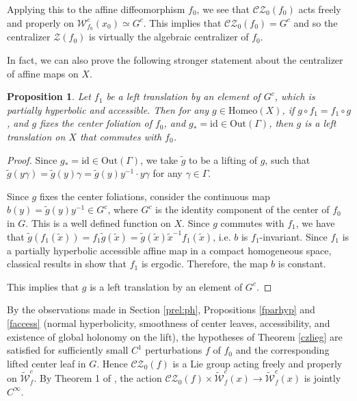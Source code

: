 \documentclass[11pt]{amsart}
\numberwithin{equation}{section}
\newcommand{\W}{\mathcal{W}}
\newcommand{\CZ}{\mathcal{CZ}}
\theoremstyle{plain}
\newtheorem{prop}[thm]{Proposition}
\begin{document}
Applying this to the affine diffeomorphism $f_0$, we see that $\CZ_0(f_0)$ acts freely and properly on $\W^c_{f_0}(x_0)\simeq G^c$. This implies that $\CZ_0(f_0)=G^c$ and so the centralizer $\mathcal Z(f_0)$ is virtually the algebraic centralizer of $f_0$.

In fact, we can also prove the following stronger statement about the centralizer of affine maps on $X$. 

\begin{prop}\label{prop:affinecent}
    Let $f_1$ be a left translation by an element of $G^c$, which is partially hyperbolic and accessible. Then for any $g\in \mathrm{Homeo}(X)$, if $g\circ f_1=f_1\circ g$, and $g$ fixes the center foliation of $f_0$, and $g_*=\mathrm{id} \in \mathrm{Out}(\Gamma)$, then $g$ is a left translation on $X$ that commutes with $f_0$.
\end{prop}
\begin{proof}
 Since $g_*=\mathrm{id} \in \mathrm{Out}(\Gamma)$, we take $\tilde g$ to be a lifting of $g$, such that $\tilde g(y\gamma)=\tilde g(y)\gamma=\tilde g(y)y^{-1}\cdot y\gamma$ for any $\gamma\in \Gamma$.
 
Since $g$ fixes the center foliations, consider the continuous map $b(y)=\tilde g(y)y^{-1}\in G^c$, where $G^c$ is the identity component of the center of $f_0$ in $G$. This is a well defined function on $X$. Since $g$ commutes with $f_1$, we have that $\tilde g(f_1(\tilde x))=f_1\tilde g(\tilde x)=\tilde g(\tilde x)\tilde x^{-1} f_1(\tilde x)$, i.e. $b$ is $f_1$-invariant. Since $f_1$ is a partially hyperbolic accessible affine map in a compact homogeneous space, classical results in \cite{PughShubStarkov} show that $f_1$ is ergodic. Therefore, the map $b$ is constant.

    This implies that $g$ is a left translation by an element of $G^c$.
\end{proof}

By the observations made in Section \ref{prel:ph}, Propositions \ref{fparhyp} and \ref{faccess} (normal hyperbolicity, smoothness of center
leaves, accessibility, and existence of global holonomy on the lift), the
hypotheses of Theorem \ref{czlieg} are satisfied for sufficiently small $C^1$
perturbations $f$ of $f_0$ and the
corresponding lifted center leaf in $G$. Hence $\CZ_0(f)$ is a Lie
group acting freely and properly on $\widetilde{\mathcal W}^c_f$. By
Theorem 1 of \cite{BM}, the
action $\CZ_0(f)\times\widetilde{\mathcal W}^c_f(x)\to\widetilde{\mathcal W}^c_f(x)$
is jointly $C^\infty$.
\end{document}
